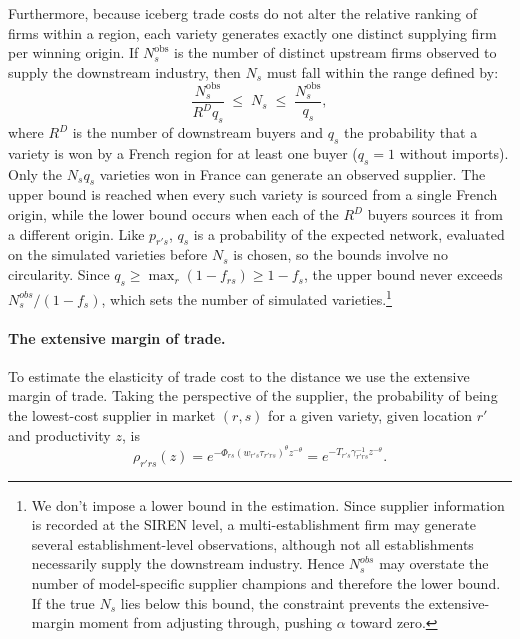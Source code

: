 Furthermore, because iceberg trade costs do not alter the relative ranking of firms within a region, each variety generates exactly one distinct supplying firm per winning origin. If $N^{\mathrm{obs}}_{s}$ is the number of distinct upstream firms observed to supply the downstream industry, then $N_{s}$ must fall within the range defined by:
\begin{equation}
\frac{N^{\mathrm{obs}}_{s}}{R^{D}q_s}\;\le\;N_{s}\;\le\;\frac{N^{\mathrm{obs}}_{s}}{q_s},
\label{eq:app-bounds}
\end{equation}
where $R^{D}$ is the number of downstream buyers and $q_s$ the probability that a variety is won by a French region for at least one buyer ($q_s=1$ without imports). Only the $N_sq_s$ varieties won in France can generate an observed supplier. The upper bound is reached when every such variety is sourced from a single French origin, while the lower bound occurs when each of the $R^{D}$ buyers sources it from a different origin. Like $p_{r's}$, $q_s$ is a probability of the expected network, evaluated on the simulated varieties before $N_s$ is chosen, so the bounds involve no circularity. Since $q_s\ge\max_r(1-f_{rs})\ge 1-f_s$, the upper bound never exceeds $N^{obs}_s/(1-f_s)$, which sets the number of simulated varieties.\footnote{We don't impose a lower bound in the estimation. Since supplier information is recorded at the SIREN level, a multi-establishment firm may generate several establishment-level observations, although not all establishments necessarily supply the downstream industry. Hence $N_s^{obs}$ may overstate the number of model-specific supplier champions and therefore the lower bound. If the true $N_s$ lies below this bound, the constraint prevents the extensive-margin moment from adjusting through, pushing $\alpha$ toward zero.} 



\paragraph{The extensive margin of trade.}\label{app:cloglog} To estimate the elasticity of trade cost to the distance we use the extensive margin of trade. Taking the perspective of the supplier, the probability of being the lowest-cost supplier in market $(r,s)$ for a given variety, given location $r'$ and productivity $z$, is
\begin{equation}
\rho_{r'rs}(z)=e^{-\Phi_{rs}(w_{r's}\tau_{r'rs})^{\theta}z^{-\theta}}
=e^{-T_{r's}\gamma^{-1}_{r'rs}z^{-\theta}} .
\label{eq:app-rho}
\end{equation}
 
